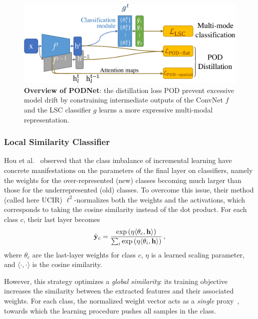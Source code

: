 \begin{figure}[t]
    \begin{center}
        \includegraphics[width=0.8\linewidth]{images/podnet/model}
    \end{center}
    \caption{\textbf{Overview of PODNet}: the distillation loss POD prevent excessive model drift by
        constraining intermediate outputs of the ConvNet $f$ and the LSC classifier $g$ learns a
        more expressive multi-modal representation.}
    \label{fig:model}
\end{figure}

\subsubsection{Local Similarity Classifier}
\label{sec:local_classifier}

Hou et al.~\citep{hou2019ucir} observed that the class imbalance of incremental learning have
concrete manifestations on the parameters of the final layer on classifiers, namely the weights for
the over-represented (new) classes becoming much larger than those for the underrepresented (old)
classes. To overcome this issue, their method (called here UCIR) $\ell^2$-normalizes both the
weights and the activations, which corresponds to taking the cosine similarity instead of the dot
product. For each class $c$, their last layer becomes
%
\begin{equation}
    \hat{\mathbf{y}}_{c}=\frac{\exp\left(\eta\langle\theta_{c},\mathbf{h}\rangle\right)}{\sum_{i} \exp \left(\eta\langle\theta_{i}, \mathbf{h}\rangle\right)}\,,
\end{equation}
%
where $\theta_c$ are the last-layer weights for class $c$, $\eta$ is a learned scaling parameter,
and $\langle\cdot,\cdot\rangle$ is the cosine similarity.

However, this strategy optimizes a \textit{global similarity}: its training objective increases the
similarity between the extracted features and their associated weights. For each class, the
normalized weight vector acts as a \textit{single} proxy~\citep{attias2017proxynca}, towards which
the learning procedure pushes all samples in the class.

